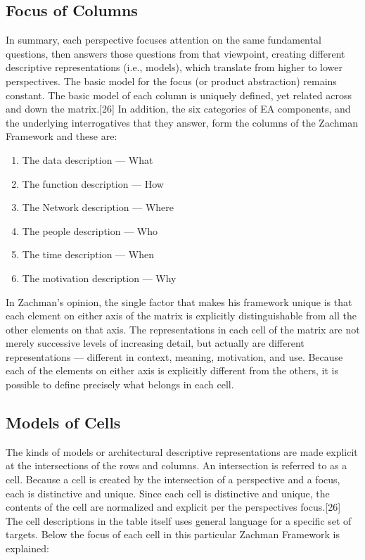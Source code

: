 \documentclass[12pt,a4paper,final,twoside,onecolumn,titlepage]{book}
\begin{document}
\subsection{Focus of Columns}
In summary, each perspective focuses attention on the same fundamental questions, then answers those questions from that viewpoint, creating different descriptive representations (i.e., models), which translate from higher to lower perspectives. The basic model for the focus (or product abstraction) remains constant. The basic model of each column is uniquely defined, yet related across and down the matrix.[26] In addition, the six categories of \gls{EA} components, and the underlying interrogatives that they answer, form the columns of the Zachman Framework and these are:
\begin{enumerate}
\item The data description — What
\item The function description — How
\item The Network description — Where
\item The people description — Who
\item The time description — When
\item The motivation description — Why
\end{enumerate}
In Zachman’s opinion, the single factor that makes his framework unique is that each element on either axis of the matrix is explicitly distinguishable from all the other elements on that axis. The representations in each cell of the matrix are not merely successive levels of increasing detail, but actually are different representations — different in context, meaning, motivation, and use. Because each of the elements on either axis is explicitly different from the others, it is possible to define precisely what belongs in each cell.
\subsection{Models of Cells}
The kinds of models or architectural descriptive representations are made explicit at the intersections of the rows and columns. An intersection is referred to as a cell. Because a cell is created by the intersection of a perspective and a focus, each is distinctive and unique. Since each cell is distinctive and unique, the contents of the cell are normalized and explicit per the perspectives focus.[26]
The cell descriptions in the table itself uses general language for a specific set of targets. Below the focus of each cell in this particular Zachman Framework is explained:
\end{document}
